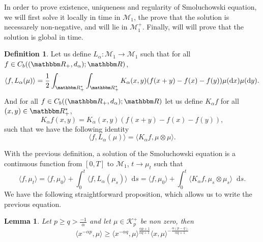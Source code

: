\documentclass[a4paper,11pt, reqno]{amsart}
\newcommand{\cK}{\mathcal{K}}	\newcommand{\KK}{\mathbbm{K}}
\newcommand{\cM}{\mathcal{M}}	\newcommand{\MM}{\mathbbm{M}}
\newcommand{\dd}{\mathop{}\!\mathrm{d}}
\newcommand{\1}{\mathbbm{1}}
\theoremstyle{plain}
\newtheorem{lemma}[theorem]{Lemma}
\theoremstyle{definition}
\newtheorem{definition}[theorem]{Definition}
\begin{document}
In order to prove existence, uniqueness and regularity of Smoluchowski
equation, we will first solve it locally in time in $\cM_1$, the prove
that the solution is necessarely non-negative, and will lie in
$\cM_1^+$. Finally, will will prove that the solution is global in
time.

\begin{definition}
  \label{def:Lalpha}Let us define $L_{\alpha} : \cM_1 \rightarrow
  \cM_1$ such that for all $f \in C_b ((\RR_+, d_{\alpha}) ;
  \RR)$,
  \[ \langle f, L_{\alpha} (\mu) \rangle = \frac{1}{2}
     \int_{\RR^{\ast}_+} \int_{\RR^{\ast}_+} K_{\alpha} (x, y)
     (f (x + y) - f (x) - f (y)) \mu (\dd x) \mu (\dd y) . \]
  And for all $f \in C_b ((\RR_+, d_{\alpha}) ; \RR)$ let us
  define $K_{\alpha} f$ for all $(x, y) \in \RR_+^{\ast}$,
  \[ K_{\alpha} f (x, y) = K_{\alpha} (x, y) (f (x + y) - f (x) - f (y)), \]
  such that we have the following identity
  \[ \langle f, L_{\alpha} (\mu) \rangle = \langle K_{\alpha} f, \mu \otimes
     \mu \rangle . \]
\end{definition}

With the previous definition, a solution of the Smoluchowski equation is a
continuous function from $[0, T]$ to $\cM_1$, $t \rightarrow \mu_t$
such that
\[ \langle f, \mu_t \rangle = \langle f, \mu_0 \rangle + \int_0^t \langle f,
   L_{\alpha} (\mu_s) \rangle \dd s = \langle f, \mu_0 \rangle + \int_0^t
   \langle K_{\alpha} f, \mu_s \otimes \mu_s \rangle \dd s. \]
We have the following straightforward proposition, which allows us to write
the previous equation.

\begin{lemma}
  \label{lemma:jensen-Kalpha}Let $p \ge q > \frac{- 1}{\alpha}$ and let
  $\mu \in \cK^+_p$ be non zero, then
  \[ \langle x^{- \alpha p}, \mu \rangle \ge \langle x^{- \alpha q}, \mu
     \rangle^{\frac{\alpha p + 1}{\alpha q + 1}} \langle x, \mu \rangle^{-
     \frac{\alpha (p - q)}{\alpha q + 1}} \]
\end{lemma}
\end{document}
